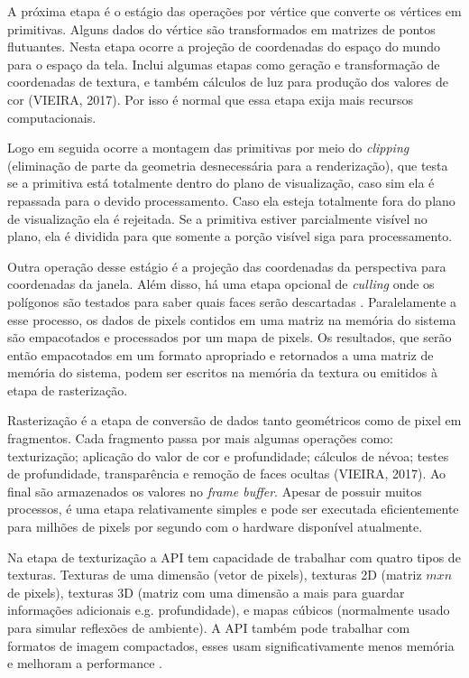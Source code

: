A próxima etapa é o estágio das operações por vértice que converte os vértices em primitivas. Alguns dados do vértice são transformados em matrizes de pontos flutuantes. Nesta etapa ocorre a projeção de coordenadas do espaço do mundo para o espaço da tela. Inclui algumas etapas como geração e transformação de coordenadas de textura, e também cálculos de luz para produção dos valores de cor (VIEIRA, 2017). Por isso é normal que essa etapa exija mais recursos computacionais. 

Logo em seguida ocorre a montagem das primitivas por meio do \textit{clipping} (eliminação de parte da geometria desnecessária para a renderização), que testa se a primitiva está totalmente dentro do plano de visualização, caso sim ela é repassada para o devido processamento. Caso ela esteja totalmente fora do plano de visualização ela é rejeitada. Se a primitiva estiver parcialmente visível no plano, ela é dividida para que somente a porção visível siga para processamento.

Outra operação desse estágio é a projeção das coordenadas da perspectiva para coordenadas da janela. Além disso, há uma etapa opcional de \textit{culling} onde os polígonos são testados para saber quais faces serão descartadas \cite{GLSLBook}. Paralelamente a esse processo, os dados de pixels contidos em uma matriz na memória do sistema são empacotados e processados por um mapa de pixels. Os resultados, que serão então empacotados em um formato apropriado e retornados a uma matriz de memória do sistema, podem ser escritos na memória da textura ou emitidos à etapa de rasterização.

Rasterização é a etapa de conversão de dados tanto geométricos como de pixel em fragmentos. Cada fragmento passa por mais algumas operações como: texturização; aplicação do valor de cor e profundidade; cálculos de névoa; testes de profundidade, transparência e remoção de faces ocultas (VIEIRA, 2017). Ao final são armazenados os valores no \textit{frame buffer}. Apesar de possuir muitos processos, é uma etapa relativamente simples e pode ser executada eficientemente para milhões de pixels por segundo com o hardware disponível atualmente.

Na etapa de texturização a API tem capacidade de trabalhar com quatro tipos de texturas. Texturas de uma dimensão (vetor de pixels), texturas 2D (matriz $ mxn $ de pixels), texturas 3D (matriz com uma dimensão a mais para guardar informações adicionais e.g. profundidade), e mapas cúbicos (normalmente usado para simular reflexões de ambiente). A API também pode trabalhar com formatos de imagem compactados, esses usam significativamente menos memória e melhoram a performance \cite{GLSLBook}.

